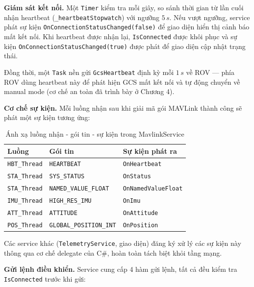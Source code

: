 \documentclass[../DoAn.tex]{subfiles}
\begin{document}
\textbf{Giám sát kết nối.}
Một \texttt{Timer} kiểm tra mỗi giây, so sánh thời gian từ lần cuối
nhận heartbeat (\texttt{\_heartbeatStopwatch}) với ngưỡng $5\,s$. Nếu
vượt ngưỡng, service phát sự kiện \texttt{OnConnectionStatusChanged(false)}
để giao diện hiển thị cảnh báo mất kết nối. Khi heartbeat được nhận
lại, \texttt{IsConnected} được khôi phục và sự kiện
\texttt{OnConnectionStatusChanged(true)} được phát để giao diện cập
nhật trạng thái.

Đồng thời, một \texttt{Task} nền gửi \texttt{GcsHeartbeat} định kỳ
mỗi $1\,s$ về ROV --- phía ROV dùng heartbeat này để phát hiện GCS
mất kết nối và tự động chuyển về manual mode (cơ chế an toàn đã trình
bày ở Chương 4).

\textbf{Cơ chế sự kiện.}
Mỗi luồng nhận sau khi giải mã gói MAVLink thành công sẽ phát một
sự kiện tương ứng:

\begin{table}[H]
\centering
\renewcommand{\arraystretch}{1.3}
\begin{tabular}{|l|l|l|}
\hline
\textbf{Luồng} & \textbf{Gói tin} & \textbf{Sự kiện phát ra} \\
\hline
\texttt{HBT\_Thread} & \texttt{HEARTBEAT}           & \texttt{OnHeartbeat} \\
\hline
\texttt{STA\_Thread} & \texttt{SYS\_STATUS}          & \texttt{OnStatus} \\
\hline
\texttt{STA\_Thread} & \texttt{NAMED\_VALUE\_FLOAT}  & \texttt{OnNamedValueFloat} \\
\hline
\texttt{IMU\_Thread} & \texttt{HIGH\_RES\_IMU}       & \texttt{OnImu} \\
\hline
\texttt{ATT\_Thread} & \texttt{ATTITUDE}             & \texttt{OnAttitude} \\
\hline
\texttt{POS\_Thread} & \texttt{GLOBAL\_POSITION\_INT}& \texttt{OnPosition} \\
\hline
\end{tabular}
\caption{Ánh xạ luồng nhận - gói tin - sự kiện trong MavlinkService}
\label{tab:mavlink_events}
\end{table}

Các service khác (\texttt{TelemetryService}, giao diện) đăng ký xử lý
các sự kiện này thông qua cơ chế delegate của C\#, hoàn toàn tách biệt
khỏi tầng mạng.

\textbf{Gửi lệnh điều khiển.}
Service cung cấp 4 hàm gửi lệnh, tất cả đều kiểm tra
\texttt{IsConnected} trước khi gửi:
\end{document}
